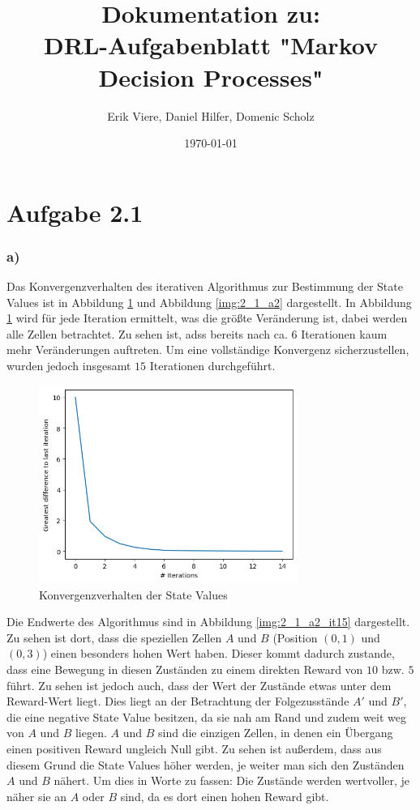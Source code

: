 \documentclass[11pt]{article}
\title{\textbf{Dokumentation zu:\\DRL-Aufgabenblatt "Markov Decision Processes"}}
\author{Erik Viere, Daniel Hilfer, Domenic Scholz}
\date{\today}
\begin{document}
\maketitle	
\pagebreak

\section*{Aufgabe 2.1}

\subsubsection*{a)}

Das Konvergenzverhalten des iterativen Algorithmus zur Bestimmung der State Values ist in Abbildung \ref{img:2_1_a1} und Abbildung \ref{img:2_1_a2} dargestellt. In Abbildung \ref{img:2_1_a1} wird für jede Iteration ermittelt, was die größte Veränderung ist, dabei werden alle Zellen betrachtet. Zu sehen ist, adss bereits nach ca. $6$ Iterationen kaum mehr Veränderungen auftreten. Um eine vollständige Konvergenz sicherzustellen, wurden jedoch insgesamt $15$ Iterationen durchgeführt.\\
\begin{figure}
    \centering
    \includegraphics[width=0.75\textwidth]{img/img_2_1_a1.png}
    \caption{Konvergenzverhalten der State Values}
    \label{img:2_1_a1}
\end{figure}
Die Endwerte des Algorithmus sind in Abbildung \ref{img:2_1_a2_it15} dargestellt. Zu sehen ist dort, dass die speziellen Zellen $A$ und $B$ (Position $(0,1)$ und $(0,3)$) einen besonders hohen Wert haben. Dieser kommt dadurch zustande, dass eine Bewegung in diesen Zuständen zu einem direkten Reward von $10$ bzw. $5$ führt. Zu sehen ist jedoch auch, dass der Wert der Zustände etwas unter dem Reward-Wert liegt. Dies liegt an der Betrachtung der Folgezusstände $A'$ und $B'$, die eine negative State Value besitzen, da sie nah am Rand und zudem weit weg von $A$ und $B$ liegen. $A$ und $B$ sind die einzigen Zellen, in denen ein Übergang einen positiven Reward ungleich Null gibt. Zu sehen ist außerdem, dass aus diesem Grund die State Values höher werden, je weiter man sich den Zuständen $A$ und $B$ nähert. Um dies in Worte zu fassen: Die Zustände werden wertvoller, je näher sie an $A$ oder $B$ sind, da es dort einen hohen Reward gibt.\\
\end{document}
